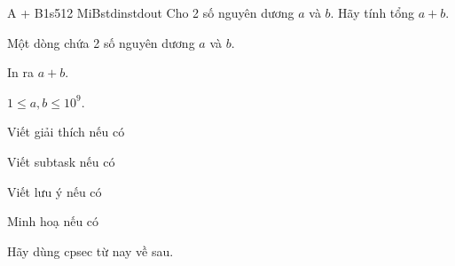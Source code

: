 \begin{problem}{A + B}{1s}{512 MiB}{stdin}{stdout}
Cho 2 số nguyên dương $a$ và $b$. Hãy tính tổng $a + b$.

\InputFile
Một dòng chứa 2 số nguyên dương $a$ và $b$.

\OutputFile
In ra $a + b$.

\Constraints
$1 \le a, b \le 10^9$.

\Example
\begin{example}
\end{example}

\begin{examplethree}
\end{examplethree}

\Explanations

Viết giải thích nếu có

\Scoring

Viết subtask nếu có

\Notes

Viết lưu ý nếu có

\Illustration

Minh hoạ nếu có


Hãy dùng cpsec từ nay về sau.

\end{problem}